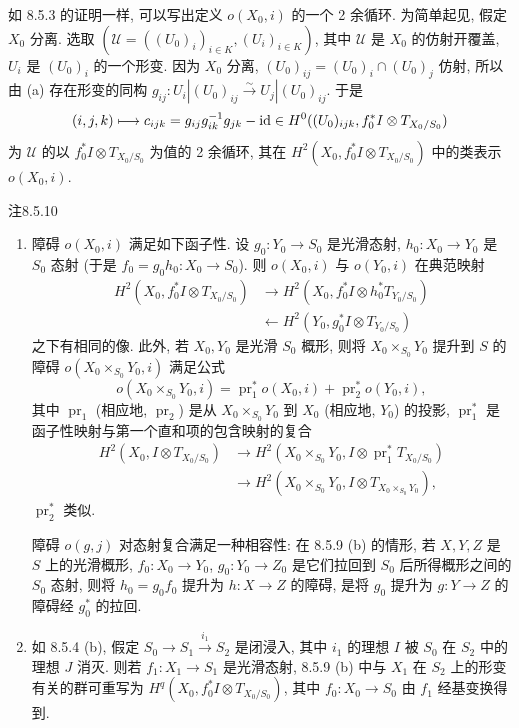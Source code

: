 如 8.5.3 的证明一样, 可以写出定义 $o(X_0,i)$ 的一个 2 余循环. 为简单起见, 假定 $X_0$ 分离. 选取 $(\mathcal U=((U_0)_i)_{i\in K},(U_i)_{i\in K})$, 其中 $\mathcal U$ 是 $X_0$ 的仿射开覆盖, $U_i$ 是 $(U_0)_i$ 的一个形变. 因为 $X_0$ 分离, $(U_0)_{ij}=(U_0)_i\cap(U_0)_j$ 仿射, 所以由 (a) 存在形变的同构 $g_{ij}:U_i|(U_0)_{ij}\xrightarrow\sim U_j|(U_0)_{ij}$. 于是
\[(i,j,k)\longmapsto c_{ijk}=g_{ij}g_{ik}^{-1}g_{jk}-\mathrm{id}\in H^0((U_0)_{ijk},f_0^*I\otimes T_{X_0/S_0})\]
为 $\mathcal U$ 的以 $f_0^*I\otimes T_{X_0/S_0}$ 为值的 2 余循环, 其在 $H^2(X_0,f_0^*I\otimes T_{X_0/S_0})$ 中的类表示 $o(X_0,i)$.

\begin{origstatement}{注}{8.5.10}\label{ch08:rem8510}
\begin{enumerate}
\item[(a)] 障碍 $o(X_0,i)$ 满足如下函子性. 设 $g_0:Y_0\to S_0$ 是光滑态射, $h_0:X_0\to Y_0$ 是 $S_0$ 态射 (于是 $f_0=g_0h_0:X_0\to S_0$). 则 $o(X_0,i)$ 与 $o(Y_0,i)$ 在典范映射
\[\begin{aligned}
H^2(X_0,f_0^*I\otimes T_{X_0/S_0})&\longrightarrow H^2(X_0,f_0^*I\otimes h_0^*T_{Y_0/S_0})\\
&\longleftarrow H^2(Y_0,g_0^*I\otimes T_{Y_0/S_0})
\end{aligned}\]
之下有相同的像.
此外, 若 $X_0,Y_0$ 是光滑 $S_0$ 概形, 则将 $X_0\times_{S_0}Y_0$ 提升到 $S$ 的障碍 $o(X_0\times_{S_0}Y_0,i)$ 满足公式
\[o(X_0\times_{S_0}Y_0,i)=\operatorname{pr}_1^*o(X_0,i)+\operatorname{pr}_2^*o(Y_0,i),\]
其中 $\operatorname{pr}_1$ (相应地, $\operatorname{pr}_2$) 是从 $X_0\times_{S_0}Y_0$ 到 $X_0$ (相应地, $Y_0$) 的投影, $\operatorname{pr}_1^*$ 是函子性映射与第一个直和项的包含映射的复合
\[\begin{aligned}
H^2(X_0,I\otimes T_{X_0/S_0})&\longrightarrow H^2(X_0\times_{S_0}Y_0,I\otimes\operatorname{pr}_1^*T_{X_0/S_0})\\
&\longrightarrow H^2(X_0\times_{S_0}Y_0,I\otimes T_{X_0\times_{S_0}Y_0}),
\end{aligned}\]
$\operatorname{pr}_2^*$ 类似.

障碍 $o(g,j)$ 对态射复合满足一种相容性: 在 8.5.9 (b) 的情形, 若 $X,Y,Z$ 是 $S$ 上的光滑概形, $f_0:X_0\to Y_0$, $g_0:Y_0\to Z_0$ 是它们拉回到 $S_0$ 后所得概形之间的 $S_0$ 态射, 则将 $h_0=g_0f_0$ 提升为 $h:X\to Z$ 的障碍, 是将 $g_0$ 提升为 $g:Y\to Z$ 的障碍经 $g_0^*$ 的拉回.
\item[(b)] 如 8.5.4 (b), 假定 $S_0\longrightarrow S_1\xrightarrow{i_1}S_2$ 是闭浸入, 其中 $i_1$ 的理想 $I$ 被 $S_0$ 在 $S_2$ 中的理想 $J$ 消灭. 则若 $f_1:X_1\to S_1$ 是光滑态射, 8.5.9 (b) 中与 $X_1$ 在 $S_2$ 上的形变有关的群可重写为 $H^q(X_0,f_0^*I\otimes T_{X_0/S_0})$, 其中 $f_0:X_0\to S_0$ 由 $f_1$ 经基变换得到.
\end{enumerate}
\end{origstatement}


